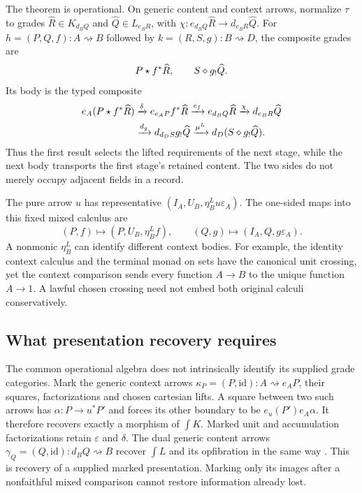 \documentclass[11pt]{article}
\numberwithin{equation}{section}
\theoremstyle{definition}\newtheorem{definition}[theorem]{Definition}
\newcommand{\id}{\mathrm{id}}\newcommand{\op}{\mathrm{op}}\newcommand{\dom}{\mathrm{dom}}\newcommand{\cod}{\mathrm{cod}}
\begin{document}
The theorem is operational. On generic content and context arrows,
normalize $\tau$ to grades $\widehat R\in K_{d_BQ}$ and
$\widehat Q\in L_{e_BR}$, with
$\chi:e_{d_BQ}\widehat R\to d_{e_BR}\widehat Q$.
For $h=(P,Q,f):A\rightsquigarrow B$ followed by
$k=(R,S,g):B\rightsquigarrow D$, the composite grades are
\begin{equation}\label{eq:grades-main}
                 P\mathbin{\star} f^*\widehat R,\qquad S\mathbin{\diamond} g_!\widehat Q.
\end{equation}
Its body is the typed composite
\begin{align*}
 e_A(P\mathbin{\star} f^*\widehat R)&\xrightarrow{\delta}e_{e_AP}f^*\widehat R
 \xrightarrow{e_f}e_{d_BQ}\widehat R\xrightarrow\chi d_{e_BR}\widehat Q\\
 &\xrightarrow{d_g}d_{d_DS}g_!\widehat Q
 \xrightarrow{\mu^L}d_D(S\mathbin{\diamond} g_!\widehat Q).
\end{align*}
Thus the first result selects the lifted requirements of the next stage,
while the next body transports the first stage's retained content. The two
sides do not merely occupy adjacent fields in a record.

The pure arrow $u$ has representative $(I_A,U_B,\eta^L_Bu\varepsilon_A)$.
The one-sided maps into this fixed mixed calculus are
\[
 (P,f)\mapsto(P,U_B,\eta^L_Bf),\qquad
 (Q,g)\mapsto(I_A,Q,g\varepsilon_A).
\]
A nonmonic $\eta^L_B$ can identify different context bodies. For example,
the identity context calculus and the terminal monad on sets have the
canonical unit crossing, yet the context comparison sends every function
$A\to B$ to the unique function $A\to 1$. A lawful chosen crossing need
not embed both original calculi conservatively.

\subsection{What presentation recovery requires}
The common operational algebra does not intrinsically identify its supplied
grade categories. Mark the generic context arrows
$\kappa_P=(P,\id):A\rightsquigarrow e_AP$, their squares, factorizations
and chosen cartesian lifts. A square between two such arrows has
$\alpha:P\to u^*P'$ and forces its other boundary to be
$e_u(P')e_A\alpha$. It therefore recovers exactly a morphism of $\int K$.
Marked unit and accumulation factorizations retain $\varepsilon$ and
$\delta$. The dual generic content arrows
$\gamma_Q=(Q,\id):d_BQ\rightsquigarrow B$ recover $\int L$ and its
opfibration in the same way \cite[Sec.~4]{U}. This is recovery of a
supplied marked presentation. Marking only its images after a nonfaithful
mixed comparison cannot restore information already lost.
\end{document}
